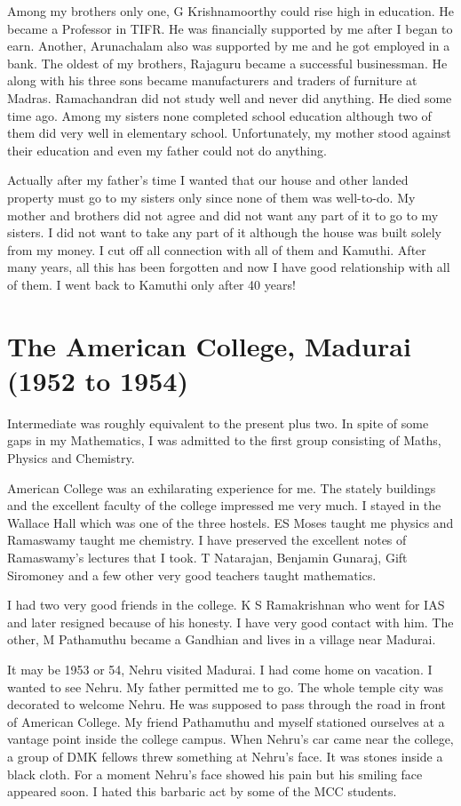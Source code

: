 Among my brothers only one, G Krishnamoorthy could rise high in 
education. He became a Professor in TIFR. He was financially supported 
by me after I began to earn. Another, Arunachalam also was supported by 
me and he got employed in a bank. The oldest of my brothers, Rajaguru 
became a successful businessman. He along with his three sons became 
manufacturers and traders of furniture at Madras. Ramachandran did not 
study well and never did anything. He died some time ago. Among my 
sisters none completed school education although two of them did very 
well in elementary school. Unfortunately, my mother stood against their 
education and even my father could not do anything.

Actually after my father's time I wanted that our house and other landed 
property must go to my sisters only since none of them was well-to-do.  
My mother and brothers did not agree and did not want any part of it to 
go to my sisters. I did not want to take any part of it although the 
house was built solely from my money. I cut off all connection with all 
of them and Kamuthi. After many years, all this has been forgotten and 
now I have good relationship with all of them. I went back to Kamuthi 
only after 40 years!
 
\section*{The American College, Madurai (1952 to 1954)}

Intermediate was roughly equivalent to the present plus two. In spite of 
some gaps in my Mathematics, I was admitted to the first group 
consisting of Maths, Physics and Chemistry.

American College was an exhilarating experience for me. The stately 
buildings and the excellent faculty of the college impressed me very 
much. I stayed in the Wallace Hall which was one of the three hostels. 
ES Moses taught me physics and Ramaswamy taught me chemistry. I have 
preserved the excellent notes of Ramaswamy's lectures that I took. T 
Natarajan, Benjamin Gunaraj, Gift Siromoney and a few other very good 
teachers taught mathematics.

I had two very good friends in the college. K S Ramakrishnan who went 
for IAS and later resigned because of his honesty. I have very good 
contact with him. The other, M Pathamuthu became a Gandhian and lives in 
a village near Madurai.

It may be 1953 or 54, Nehru visited Madurai. I had come home on 
vacation. I wanted to see Nehru. My father permitted me to go. The whole 
temple city was decorated to welcome Nehru. He was supposed to pass 
through the road in front of American College. My friend Pathamuthu and 
myself stationed ourselves at a vantage point inside the college campus. 
When Nehru's car came near the college, a group of DMK fellows threw 
something at Nehru's face. It was stones inside a black cloth. For a 
moment Nehru's face showed his pain but his smiling face appeared soon. 
I hated this barbaric act by some of the MCC students.

